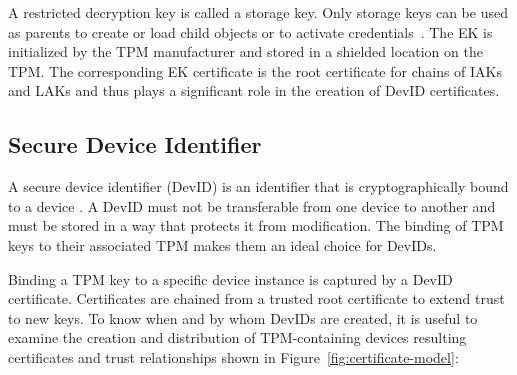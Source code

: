 \documentclass[runningheads]{llncs}
\begin{document}
A restricted decryption key is called a storage key. Only storage keys
can be used as parents to create or load child objects or to activate
credentials~\citep{PracticalGuide}. The EK is initialized by the TPM
manufacturer and stored in a shielded location on the TPM. The
corresponding EK certificate is the root certificate for chains of
IAKs and LAKs and thus plays a significant role in the creation of
DevID certificates.

\subsection{Secure Device Identifier}
A secure device identifier (DevID) is an identifier that is
cryptographically bound to a device \citep{DevIDSpec-IEEE}. A DevID
must not be transferable from one device to another and must be stored
in a way that protects it from modification. The binding of TPM keys
to their associated TPM makes them an ideal choice for DevIDs.

Binding a TPM key to a specific device instance is captured by a DevID
certificate. Certificates are chained from a trusted root certificate
to extend trust to new keys. To know when and by whom DevIDs are
created, it is useful to examine the creation and distribution of
TPM-containing devices resulting certificates and trust relationships
shown in Figure~\ref{fig:certificate-model}:




\end{document}
